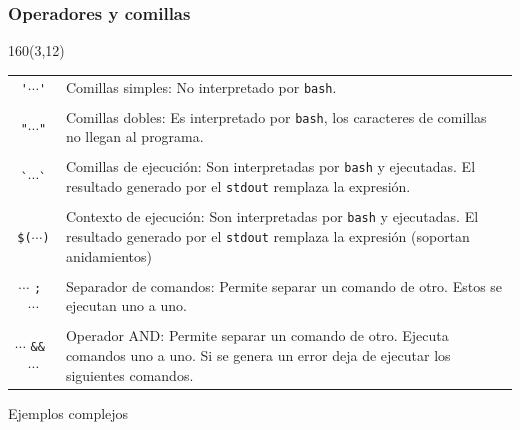 \documentclass{beamer}
\begin{document}
\begin{frame}[fragile,t]
    \frametitle{Operadores y comillas}
    \begin{textblock}{160}(3,12)
    \begin{tabular}{cp{9cm}}
    \verb|'|\textcolor{naranjauca}{$\cdots$}\verb|'|  & Comillas simples: \small{ No interpretado por \texttt{bash}.}\\
    \\
    \verb|"|\textcolor{naranjauca}{$\cdots$}\verb|"|  & Comillas dobles: \small{ Es interpretado por \texttt{bash}, los caracteres de comillas no llegan al programa.}\\
    \\
    \verb|`|\textcolor{naranjauca}{$\cdots$}\verb|`|  & Comillas de ejecuci\'on: \small{ Son interpretadas por \texttt{bash} y ejecutadas. El resultado generado por el \texttt{stdout} remplaza la expresi\'on.}\\
    \\
    \verb|$(|\textcolor{naranjauca}{$\cdots$}\verb|)| & Contexto de ejecuci\'on: \small{ Son interpretadas por \texttt{bash} y ejecutadas. El resultado generado por el \texttt{stdout} remplaza la expresi\'on (soportan anidamientos)}\\
    \\
    \textcolor{naranjauca}{$\cdots$} \verb|; | \textcolor{naranjauca}{$\cdots$} & Separador de comandos: \small{ Permite separar un comando de otro. Estos se ejecutan uno a uno. }\\
    \\
    \textcolor{naranjauca}{$\cdots$} \verb|&& | \textcolor{naranjauca}{$\cdots$} & Operador AND: \small{ Permite separar un comando de otro. Ejecuta comandos uno a uno. Si se genera un error deja de ejecutar los siguientes comandos. }\\
    \end{tabular}
    \end{textblock}
\end{frame}

\begin{frame}[plain]
  \textcolor{naranjauca}{\huge Ejemplos complejos}
\end{frame}
\end{document}

